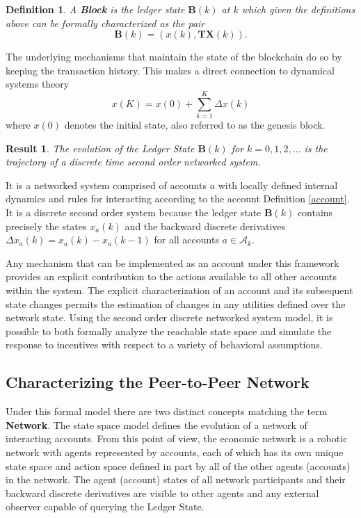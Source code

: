 \documentclass[letterpaper, 10 pt, conference]{ieeeconf}  %
\newtheorem{definition}{Definition}
\newtheorem{result}{Result}
\begin{document}
\begin{definition}
A \textbf{Block} is the ledger state $\mathbf{B}(k)$ at $k$ which given the definitions above can be formally characterized as the pair
\begin{equation}
    \mathbf{B}(k) = (x(k), \mathbf{TX}(k) ).
\end{equation}
\end{definition}

The underlying mechanisms that maintain the state of the blockchain do so by keeping the transaction history. This makes a direct connection to dynamical systems theory
\begin{equation}
x(K) = x(0)+ \sum_{k=1}^{K} \Delta x(k) \label{sums}
\end{equation}
where $x(0)$ denotes the initial state, also referred to as the genesis block.

\begin{result}
The evolution of the Ledger State $\mathbf{B}(k)$ for $k=0,1,2, \ldots$ is the trajectory of a discrete time second order networked system. 
\end{result}

It is a networked system comprised of accounts $a$ with locally defined internal dynamics and rules for interacting according to the account Definition \ref{account}. It is a discrete second order system because the ledger state $\mathbf{B}(k)$ contains precisely the states $x_a(k)$ and the backward discrete derivatives $\Delta x_a(k) = x_a(k) - x_a(k-1)$ for all accounts $a \in \mathcal{A}_k$.

Any mechanism that can be implemented as an account under this framework provides an explicit contribution to the actions available to all other accounts within the system. The explicit characterization of an account and its subsequent state changes permits the estimation of changes in any utilities defined over the network state. Using the second order discrete networked system model, it is possible to both formally analyze the reachable state space and simulate the response to incentives with respect to a variety of behavioral assumptions.

\subsection{Characterizing the Peer-to-Peer Network}

Under this formal model there are two distinct concepts matching the term \textbf{Network}. The state space model defines the evolution of a network of interacting accounts. From this point of view, the economic network is a robotic network with agents represented by accounts, each of which has its own unique state space and action space defined in part by all of the other agents (accounts) in the network. The agent (account) states of all network participants and their backward discrete derivatives are visible to other agents and any external observer capable of querying the Ledger State.
\end{document}
